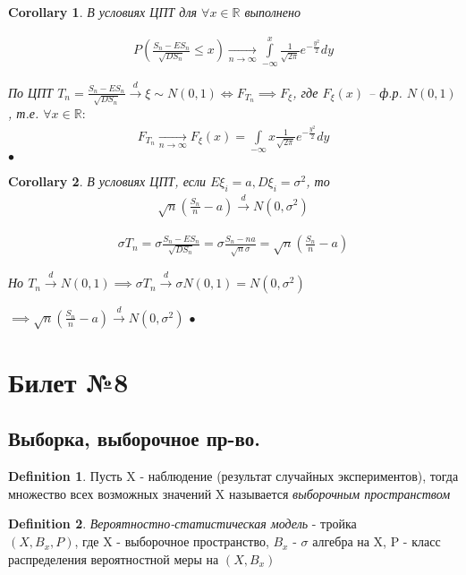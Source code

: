 \documentclass[a4paper]{article}
\theoremstyle{plain}
\newtheorem{corollary}{Corollary}
\theoremstyle{remark}
\theoremstyle{definition}
\newtheorem{definition}{Definition}
\renewenvironment{proof}{{\bfseries Proof}}{$\bullet$}
\newcommand{\pars}[1]{\left( #1 \right)}
\newcommand{\setR}{\mathbb{R}}
\newcommand{\toup}[1]{\xrightarrow{#1}}
\newcommand{\todown}[1]{\xrightarrow[#1]{}}
\renewcommand{\leq}{\leqslant}
\begin{document}
\begin{corollary}
  В условиях ЦПТ для $\forall x \in \setR$ выполнено
  
  \begin{align*}
    P\pars{\frac{S_n - E S_n}{\sqrt{D S_n}} \leq x} 
    \todown{n \to \infty} \int\limits_{-\infty}^{x} \frac{1}{\sqrt{2\pi}} e^{-\frac{y^2}{2}} dy
  \end{align*}

  \begin{proof}
    По ЦПТ $T_n = \frac{S_n - E S_n}{\sqrt{D S_n}} \toup{d} \xi \sim N(0, 1) 
    \iff F_{T_n} \implies F_{\xi}$, где $F_{\xi} (x)$  -- ф.р. $N(0, 1)$, т.е.
    $\forall x \in \setR:$
    \begin{align*}
      F_{T_n} \todown{n \to \infty} F_{\xi} (x) 
      = \int\limits_{-\infty}{x} \frac{1}{\sqrt{2 \pi}} e^{-\frac{y^2}{2}} dy
    \end{align*}
  \end{proof}
\end{corollary}

\begin{corollary}
  В условиях ЦПТ, если $E \xi_i = a, D \xi_i = \sigma^2$, то
  \begin{align*}
    \sqrt{n} \pars{\frac{S_n}{n} - a} \toup{d} N(0, \sigma^2)
  \end{align*}

  \begin{proof}
    \begin{align*}
      \sigma T_n = \sigma \frac{S_n - E S_n}{\sqrt{D S_n}} 
      = \sigma \frac{S_n - na}{\sqrt{n} \sigma} = \sqrt{n} \pars{\frac{S_n}{n} - a}
    \end{align*}

    Но $T_n \toup{d} N(0, 1) \implies \sigma T_n \toup{d} \sigma N(0, 1) = N(0, \sigma^2)$

    $\implies \sqrt{n} \pars{\frac{S_n}{n} - a} \toup{d} N(0, \sigma^2)$
  \end{proof}
\end{corollary}


\section{Билет №8}
\subsection{Выборка, выборочное пр-во.}
\begin{definition}
Пусть X - наблюдение (результат случайных экспериментов), тогда множество всех возможных значений X называется \emph{выборочным пространством}
\end{definition}
\begin{definition}
\emph{Вероятностно-статистическая модель} - тройка\\
$(X, B_x, P)$, где X - выборочное пространство, $B_x$ - $\sigma$ алгебра на X, P - класс распределения вероятностной меры на $(X, B_x)$
\end{definition}
\end{document}
